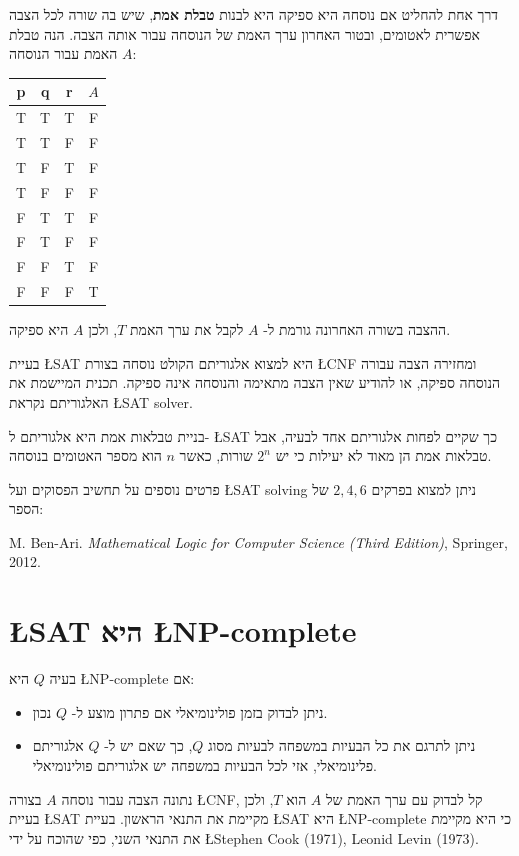 \documentclass[12pt,a4paper]{article}
\begin{document}
דרך אחת להחליט אם נוסחה היא ספיקה היא לבנות
\textbf{טבלת אמת},
שיש בה שורה לכל הצבה אפשרית לאטומים, ובטור האחרון ערך האמת של הנוסחה עבור אותה הצבה. הנה טבלת האמת עבור הנוסחה
$A$:
\begin{center}
\begin{tabular}{|c|c|c||c|}
\hline
p & q & r & $A$\\\hline
T & T & T & F\\\hline
T & T & F & F\\\hline
T & F & T & F\\\hline
T & F & F & F\\\hline
F & T & T & F\\\hline
F & T & F & F\\\hline
F & F & T & F\\\hline
F & F & F & T\\\hline
\end{tabular}
\end{center}
ההצבה בשורה האחרונה גורמת ל-%
$A$
לקבל את ערך האמת
$T$,
ולכן
$A$
היא ספיקה.

בעיית 
\L{SAT}
היא למצוא אלגוריתם הקולט נוסחה בצורת
\L{CNF}
ומחזירה הצבה עבורה הנוסחה ספיקה, או להודיע שאין הצבה מתאימה והנוסחה אינה ספיקה. תכנית המיישמת את האלגוריתם נקראת
\L{SAT solver}.

בניית טבלאות אמת היא אלגוריתם ל-%
\L{SAT}
כך שקיים לפחות אלגוריתם אחד לבעיה, אבל טבלאות אמת הן מאוד לא יעילות כי יש 
$2^n$
שורות, כאשר
$n$
הוא מספר האטומים בנוסחה.

פרטים נוספים על תחשיב הפסוקים ועל
\L{SAT solving}
ניתן למצוא בפרקים
$2,4,6$
של הספר:

M. Ben-Ari. \textit{Mathematical Logic for Computer Science (Third Edition)}, Springer, 2012.

\section{\L{SAT} היא \L{NP-complete}}

בעיה 
$Q$
היא
\L{NP-complete}
אם:
\begin{itemize}
\item
ניתן לבדוק בזמן פולינומיאלי אם פתרון מוצע ל-%
$Q$
נכון.
\item
ניתן לתרגם את כל הבעיות במשפחה לבעיות מסוג 
$Q$,
כך שאם יש ל-%
$Q$
אלגוריתם פלינומיאלי, אזי לכל הבעיות במשפחה יש אלגוריתם פולינומיאלי.
\end{itemize}
נתונה הצבה עבור נוסחה
$A$
בצורה
\L{CNF},
קל לבדוק עם ערך האמת של
$A$
הוא
$T$,
ולכן בעיית
\L{SAT}
מקיימת את התנאי הראשון. בעיית 
\L{SAT}
היא 
\L{NP-complete}
כי היא מקיימת את התנאי השני, כפי שהוכח על ידי
\L{Stephen Cook (1971), Leonid Levin (1973)}.
\end{document}
